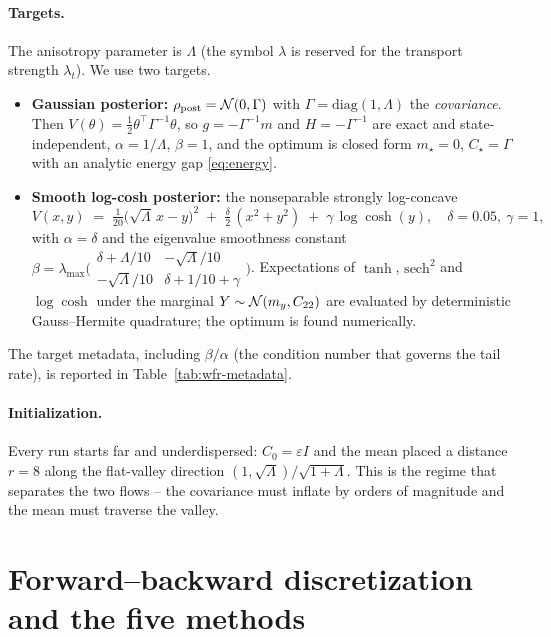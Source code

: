 \documentclass[11pt]{article}
\begin{document}
\paragraph{Targets.}
The anisotropy parameter is $\Lambda$ (the symbol $\lambda$ is reserved for the
transport strength $\lambda_t$). We use two targets.
\begin{itemize}
\item \textbf{Gaussian posterior:} $\rho_{\mathrm{post}}=\mathcal{N}(0,\Gamma)$ with
$\Gamma=\mathrm{diag}(1,\Lambda)$ the \emph{covariance}. Then
$V(\theta)=\tfrac12\theta^\top\Gamma^{-1}\theta$, so $g=-\Gamma^{-1}m$ and
$H=-\Gamma^{-1}$ are exact and state-independent, $\alpha=1/\Lambda$, $\beta=1$,
and the optimum is closed form $m_\star=0$, $C_\star=\Gamma$ with an analytic
energy gap \eqref{eq:energy}.
\item \textbf{Smooth log-cosh posterior:} the nonseparable strongly log-concave
\begin{equation}
V(x,y) \;=\; \tfrac{1}{20}\big(\sqrt{\Lambda}\,x - y\big)^2
\;+\; \tfrac{\delta}{2}\,(x^2+y^2)
\;+\; \gamma\,\log\cosh(y),
\quad \delta=0.05,\ \gamma=1 ,
\end{equation}
with $\alpha=\delta$ and the eigenvalue smoothness constant
$\beta=\lambda_{\max}\!\big(\begin{smallmatrix}\delta+\Lambda/10 &
-\sqrt{\Lambda}/10\\ -\sqrt{\Lambda}/10 & \delta+1/10+\gamma\end{smallmatrix}\big)$.
Expectations of $\tanh$, $\mathrm{sech}^2$ and $\log\cosh$ under the marginal
$Y\sim\mathcal{N}(m_y,C_{22})$ are evaluated by deterministic Gauss--Hermite quadrature;
the optimum is found numerically.
\end{itemize}
The target metadata, including $\beta/\alpha$ (the condition number that governs
the tail rate), is reported in Table~\ref{tab:wfr-metadata}.

\paragraph{Initialization.}
Every run starts far and underdispersed: $C_0=\varepsilon I$ and the mean placed
a distance $r=8$ along the flat-valley direction
$(1,\sqrt{\Lambda})/\sqrt{1+\Lambda}$. This is the regime that separates the two
flows -- the covariance must inflate by orders of magnitude and the mean must
traverse the valley.

\section{Forward--backward discretization and the five methods}
\label{sec:methods}
\end{document}
